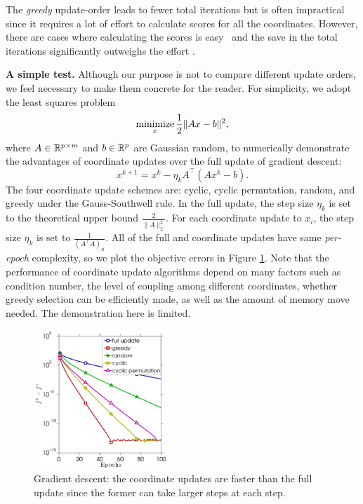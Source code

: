 The \emph{greedy} update-order leads to fewer total iterations but is often impractical since it requires a lot of effort to calculate  scores for all the coordinates. However, there are cases where calculating the scores is easy~\cite{bertsekas1999nonlinear, li2009gcoord, wu2008coordinate} and the save in the total iterations significantly outweighs the effort \cite{tseng2009_CGD, dhillon2011nearest, PYY_2013_GRock, schmidt2014coordinate}. 

\textbf{A simple test.} Although our purpose is not to compare different update orders, we feel necessary to make them concrete for the reader. For simplicity, we adopt the least squares problem
$$\operatorname*{minimize}_{x} \frac{1}{2} \|A x - b\|^2,$$
where $A \in \mathbb{R}^{p \times m}$ and $b \in \mathbb{R}^p$ are Gaussian random, to numerically demonstrate the advantages of coordinate updates over the  full update of  gradient descent:
$$x^{k+1} = x^k - \eta_k A^{\top}(A x^k - b).$$
The four coordinate update schemes are: cyclic, cyclic permutation, random, and greedy under the Gauss-Southwell rule. 
In the full update, the step size $\eta_k$ is set to the theoretical upper bound $\frac{2}{\|A\|_2^2}$. For each coordinate update to $x_i$, the step size $\eta_k$ is set to $\frac{1}{(A^{\top}A)_{ii}}$. All of the full and coordinate updates have same \emph{per-epoch} complexity, so we plot the objective errors in Figure \ref{fig:ls_full_vs_coord}. 
Note that the performance of coordinate update algorithms depend on many factors such as condition number, the level of coupling among different coordinates, whether greedy selection can be efficiently made, as well as the amount of memory move needed. The demonstration here is limited. 
\begin{figure}[!htbp] \centering
\includegraphics[width=50mm]{./figs/randn_matrix_cropped}

\caption{Gradient descent: the coordinate updates are faster than the full update since the former can take larger steps at each step.}
\label{fig:ls_full_vs_coord}
\end{figure}



